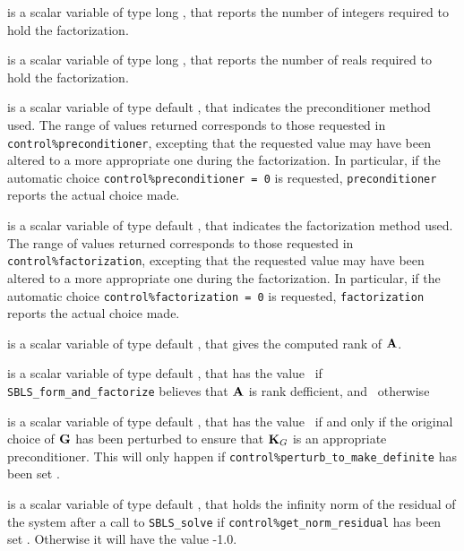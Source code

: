 \documentclass{galahad}
\newcommand{\packagename}{SBLS}
\begin{document}
\begin{description}

 is a scalar variable of type long \integer,
that reports the number of integers required to hold the factorization.

 is a scalar variable of type long \integer,
that reports the number of reals required to hold the factorization.

 is a scalar variable of type default \integer,
that indicates the preconditioner method used. The range of values returned
corresponds to those requested in {\tt control\%preconditioner},
excepting that the requested value may have been altered to a more
appropriate one during the factorization. In particular, if the automatic
choice {\tt control\%preconditioner = 0} is requested,
{\tt preconditioner} reports the actual choice made.

 is a scalar variable of type default \integer,
that indicates the factorization method used. The range of values returned
corresponds to those requested in {\tt control\%factorization},
excepting that the requested value may have been altered to a more
appropriate one during the factorization.
In particular, if the automatic
choice {\tt control\%factorization = 0} is requested,
{\tt factorization} reports the actual choice made.

 is a scalar variable of type default \integer, that gives the
computed rank of ${\mathbf{A}}$.

 is a scalar variable of type default \logical, that has the
value \true\ if {\tt \packagename\_form\_and\_factorize} believes that
${\mathbf{A}}$ is rank defficient, and \false\ otherwise

 is a scalar variable of type default \logical, that has the
value \true\ if and only if the original choice of ${\mathbf{G}}$ has been perturbed to
ensure that ${\mathbf{K}}_G$ is an appropriate preconditioner. This will only
happen if {\tt control\-\%perturb\_to\_make\_definite} has been set \true.

 is a scalar variable of type default \realdp,
that holds the infinity norm of the residual of the system 
after a call to {\tt \packagename\_solve} if {\tt control\%get\_norm\_residual}
has been set \true. Otherwise it will have the value -1.0.


\end{description}
\end{document}
